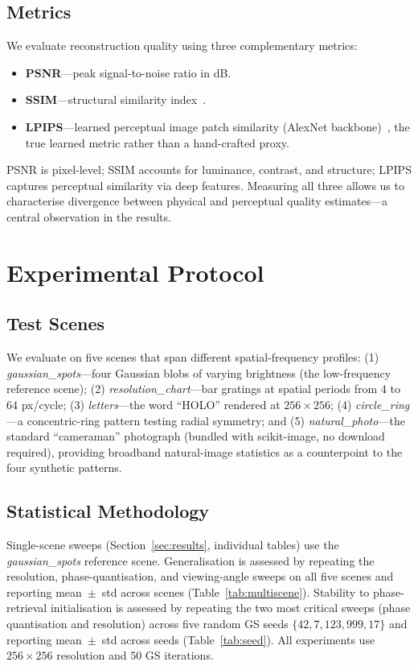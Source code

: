 \documentclass[conference]{IEEEtran}
\begin{document}
\subsection{Metrics}
We evaluate reconstruction quality using three complementary metrics:
\begin{itemize}
  \item \textbf{PSNR}---peak signal-to-noise ratio in dB.
  \item \textbf{SSIM}---structural similarity index~\cite{wang2004image}.
  \item \textbf{LPIPS}---learned perceptual image patch similarity
        (AlexNet backbone)~\cite{zhang2018unreasonable}, the true learned metric
        rather than a hand-crafted proxy.
\end{itemize}
PSNR is pixel-level; SSIM accounts for luminance, contrast, and structure; LPIPS
captures perceptual similarity via deep features. Measuring all three allows us to
characterise divergence between physical and perceptual quality estimates---a
central observation in the results.

\section{Experimental Protocol}
\label{sec:experiments}

\subsection{Test Scenes}
We evaluate on five scenes that span different spatial-frequency profiles: (1)
\textit{gaussian\_spots}---four Gaussian blobs of varying brightness (the
low-frequency reference scene); (2) \textit{resolution\_chart}---bar gratings at
spatial periods from $4$ to $64$ px/cycle; (3) \textit{letters}---the word
``HOLO'' rendered at $256\times256$; (4) \textit{circle\_ring}---a concentric-ring
pattern testing radial symmetry; and (5) \textit{natural\_photo}---the standard
``cameraman'' photograph (bundled with scikit-image, no download required),
providing broadband natural-image statistics as a counterpoint to the four
synthetic patterns.

\subsection{Statistical Methodology}
Single-scene sweeps (Section~\ref{sec:results}, individual tables) use the
\textit{gaussian\_spots} reference scene. Generalisation is assessed by repeating
the resolution, phase-quantisation, and viewing-angle sweeps on all five scenes
and reporting mean~$\pm$~std across scenes (Table~\ref{tab:multiscene}). Stability
to phase-retrieval initialisation is assessed by repeating the two most critical
sweeps (phase quantisation and resolution) across five random GS seeds
$\{42, 7, 123, 999, 17\}$ and reporting mean~$\pm$~std across seeds
(Table~\ref{tab:seed}). All experiments use $256\times256$ resolution and $50$ GS
iterations.
\end{document}
